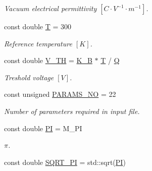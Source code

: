 \begin{DoxyCompactItemize}
\begin{DoxyCompactList}\small\item\em Vacuum electrical permittivity $ \left[ C \cdot V^{-1} \cdot m^{-1} \right] $. \end{DoxyCompactList}\item 
\hypertarget{namespaceconstants_aee9271065c005ea3392646a1151202c8}{const double \hyperlink{namespaceconstants_aee9271065c005ea3392646a1151202c8}{T} = 300}\label{namespaceconstants_aee9271065c005ea3392646a1151202c8}

\begin{DoxyCompactList}\small\item\em Reference temperature $ \left[ K \right] $. \end{DoxyCompactList}\item 
\hypertarget{namespaceconstants_afd7a7b38f822d154b359b383913a41f4}{const double \hyperlink{namespaceconstants_afd7a7b38f822d154b359b383913a41f4}{V\-\_\-\-T\-H} = \hyperlink{namespaceconstants_a00c952dfd5e516e8aed05892039e2723}{K\-\_\-\-B} $\ast$ \hyperlink{namespaceconstants_aee9271065c005ea3392646a1151202c8}{T} / \hyperlink{namespaceconstants_a4a1828262ad1758b7ba69747f653b3b5}{Q}}\label{namespaceconstants_afd7a7b38f822d154b359b383913a41f4}

\begin{DoxyCompactList}\small\item\em Treshold voltage $ \left[ V \right] $. \end{DoxyCompactList}\item 
\hypertarget{namespaceconstants_a55c7c5d84b0709c6786dec9908107a04}{const unsigned \hyperlink{namespaceconstants_a55c7c5d84b0709c6786dec9908107a04}{P\-A\-R\-A\-M\-S\-\_\-\-N\-O} = 22}\label{namespaceconstants_a55c7c5d84b0709c6786dec9908107a04}

\begin{DoxyCompactList}\small\item\em Number of parameters required in input file. \end{DoxyCompactList}\item 
\hypertarget{namespaceconstants_a952eac791b596a61bba0a133a3bb439f}{const double \hyperlink{namespaceconstants_a952eac791b596a61bba0a133a3bb439f}{P\-I} = M\-\_\-\-P\-I}\label{namespaceconstants_a952eac791b596a61bba0a133a3bb439f}

\begin{DoxyCompactList}\small\item\em $ \pi $. \end{DoxyCompactList}\item 
\hypertarget{namespaceconstants_a7477e8f618e55155827d512dc7a0f098}{const double \hyperlink{namespaceconstants_a7477e8f618e55155827d512dc7a0f098}{S\-Q\-R\-T\-\_\-\-P\-I} = std\-::sqrt(\hyperlink{namespaceconstants_a952eac791b596a61bba0a133a3bb439f}{P\-I})}\label{namespaceconstants_a7477e8f618e55155827d512dc7a0f098}


\end{DoxyCompactItemize}
